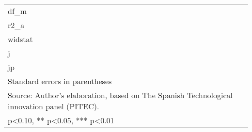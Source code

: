 \begin{table}[htbp]
\begin{tabular}{l*{9}{c}}
df\_m                &               &               &               &               &               &               &               &               &               \\
r2\_a                &               &               &               &               &               &               &               &               &               \\
widstat             &               &               &               &               &               &               &               &               &               \\
j                   &               &               &               &               &               &               &               &               &               \\
jp                  &               &               &               &               &               &               &               &               &               \\
\hline\hline
\multicolumn{10}{l}{\footnotesize Standard errors in parentheses}\\
\multicolumn{10}{l}{\footnotesize Source: Author's elaboration, based on The Spanish Technological innovation panel (PITEC).}\\
\multicolumn{10}{l}{\footnotesize * p<0.10, ** p<0.05, *** p<0.01}\\
\end{tabular}
\end{table}
